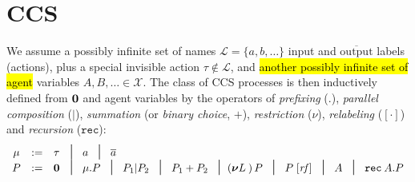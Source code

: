 
\section{CCS}
\label{ss:ccs}

We assume a possibly infinite set of names $\mathscr{L} = \{a, b,
\ldots\}$  input and $\overline{\mbox{output}}$ labels (actions), plus a special invisible
action $\tau \notin \mathscr{L}$, and \hl{another possibly infinite
  set of agent} variables $A, B,
\ldots \in \mathscr{X}$.
The class of CCS processes is then inductively
defined from ${\boldsymbol 0}$  and agent variables by the operators
of \emph{prefixing} (.), \emph{parallel composition} ($|$),
\emph{summation}
(or \emph{binary choice}, $+$),
\emph{restriction} ($\nu$), \emph{relabeling} ($[\cdot]$) and
\emph{recursion} ($\texttt{rec}$):
\begin{equation*}
\begin{array}{cccl}
\mu  & := & \tau\!\!\!\! & \midd \; a  \; \midd \;  \outC a  \\
P  & := & \nil\!\!\!\! & \midd \;  \mu . P \; \midd \;  P_1 |  P_2 \; \midd  \;
P_1 + P_2 \; \midd 
(\res L)\, P
\; \midd \; P\; [\mathit{rf}]  %
\;  \midd \;  A \; \midd \; \recu A  P
\end{array}
\end{equation*}
